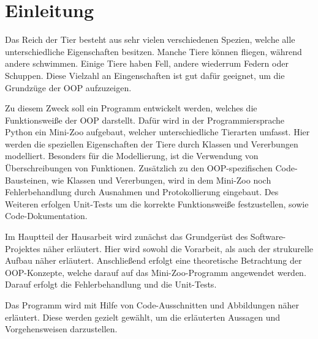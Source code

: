 
\chapter{Einleitung}
Das Reich der Tier besteht aus sehr vielen verschiedenen Spezien, welche alle unterschiedliche Eigenschaften besitzen.
Manche Tiere können fliegen, während andere schwimmen. Einige Tiere haben Fell, andere wiederrum Federn oder Schuppen.
Diese Vielzahl an Eingenschaften ist gut dafür geeignet, um die Grundzüge der \acf{OOP} aufzuzeigen.

Zu diesem Zweck soll ein Programm entwickelt werden, welches die Funktionsweiße der \acs{OOP} darstellt.
Dafür wird in der Programmiersprache Python ein Mini-Zoo aufgebaut, welcher unterschiedliche Tierarten umfasst.
Hier werden die speziellen Eigenschaften der Tiere durch Klassen und Vererbungen modelliert. Besonders für die Modellierung,
ist die Verwendung von Überschreibungen von Funktionen. Zusätzlich zu den \acs{OOP}-spezifischen Code-Bausteinen,
wie Klassen und Vererbungen, wird in dem Mini-Zoo noch Fehlerbehandlung durch Ausnahmen und Protokollierung eingebaut.
Des Weiteren erfolgen Unit-Tests um die korrekte Funktionsweiße festzustellen, sowie Code-Dokumentation.

Im Hauptteil der Hausarbeit wird zunächst das Grundgerüst des Software-Projektes näher erläutert. Hier wird
sowohl die Vorarbeit, als auch der strukurelle Aufbau näher erläutert. Anschließend erfolgt eine theoretische 
Betrachtung der \acs{OOP}-Konzepte, welche darauf auf das Mini-Zoo-Programm angewendet werden. Darauf erfolgt 
die Fehlerbehandlung und die Unit-Tests. 

Das Programm wird mit Hilfe von Code-Ausschnitten und Abbildungen näher erläutert. Diese werden gezielt gewählt,
um die erläuterten Aussagen und Vorgehensweisen darzustellen.

